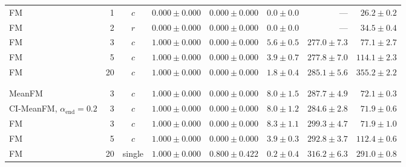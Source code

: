 \begin{table}[htpb]
\begin{tabularx}{\linewidth}{@{}L r c rrrrr@{}}
    FM & 1 & $c$ & $0.000 \pm 0.000$ & $0.000 \pm 0.000$ & $0.0 \pm 0.0$ & --- & $26.2 \pm 0.2$ \\
    FM & 2 & $r$ & $0.000 \pm 0.000$ & $0.000 \pm 0.000$ & $0.0 \pm 0.0$ & --- & $34.5 \pm 0.4$ \\
    FM & 3 & $c$ & $1.000 \pm 0.000$ & $0.000 \pm 0.000$ & $5.6 \pm 0.5$ & $277.0 \pm 7.3$ & $77.1 \pm 2.7$ \\
    FM & 5 & $c$ & $1.000 \pm 0.000$ & $0.000 \pm 0.000$ & $3.9 \pm 0.7$ & $277.8 \pm 7.0$ & $114.1 \pm 2.3$ \\
    FM & 20 & $c$ & $1.000 \pm 0.000$ & $0.000 \pm 0.000$ & $1.8 \pm 0.4$ & $285.1 \pm 5.6$ & $355.2 \pm 2.2$ \\
     &  &  &  &  &  &  &  \\
    \addlinespace[3pt]
    \\
    MeanFM & 3 & $c$ & $1.000 \pm 0.000$ & $0.000 \pm 0.000$ & $8.0 \pm 1.5$ & $287.7 \pm 4.9$ & $72.1 \pm 0.3$ \\
    CI-MeanFM, $\alpha_{\mathrm{end}}=0.2$ & 3 & $c$ & $1.000 \pm 0.000$ & $0.000 \pm 0.000$ & $8.0 \pm 1.2$ & $284.6 \pm 2.8$ & $71.9 \pm 0.6$ \\
    FM & 3 & $c$ & $1.000 \pm 0.000$ & $0.000 \pm 0.000$ & $8.3 \pm 1.1$ & $299.3 \pm 4.7$ & $71.9 \pm 1.0$ \\
    FM & 5 & $c$ & $1.000 \pm 0.000$ & $0.000 \pm 0.000$ & $3.9 \pm 0.3$ & $292.8 \pm 3.7$ & $112.4 \pm 0.6$ \\
    FM & 20 & single & $1.000 \pm 0.000$ & $0.800 \pm 0.422$ & $0.2 \pm 0.4$ & $316.2 \pm 6.3$ & $291.0 \pm 0.8$ \\
    \bottomrule
  \end{tabularx}
\end{table}

